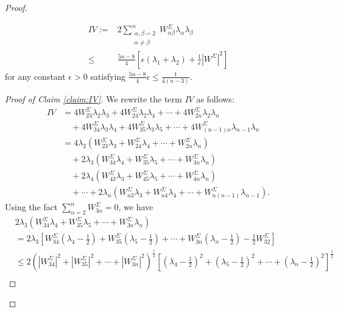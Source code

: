 \documentclass[10pt,a4paper]{amsart}
\begin{document}
\begin{proof}
	\begin{claim}\label{claim:IV}
		\begin{equation*}\label{eq:claim-IV}
		\begin{aligned}
			IV := &2\sum_{\substack{\alpha,\beta=2 \\ \alpha\neq\beta}}^n W^{\Sigma}_{\alpha\beta}\lambda_\alpha\lambda_\beta\\
			 \leq& \frac{5n-8}{4}\left[\epsilon(\lambda_1+\lambda_2) + \frac{1}{\epsilon}|W^{\Sigma}|^2\right]
		\end{aligned}
		\end{equation*}
		for any constant $\epsilon > 0$ satisfying $\frac{5n-8}{4}\epsilon \leq \frac{1}{4(n-3)}$.
	\end{claim}
	
	\begin{proof}[Proof of Claim \ref{claim:IV}]
		We rewrite the term $IV$ as follows:
		\begin{align*}
			IV &= 4W^{\Sigma}_{23}\lambda_{2}\lambda_{3} + 4W^{\Sigma}_{24}\lambda_{2}\lambda_{4} + \cdots + 4W^{\Sigma}_{2n}\lambda_{2}\lambda_{n} \\
			&\quad + 4W^{\Sigma}_{34}\lambda_{3}\lambda_{4} + 4W^{\Sigma}_{35}\lambda_{3}\lambda_{5} + \cdots + 4W^{\Sigma}_{(n-1)n}\lambda_{n-1}\lambda_{n} \\
			&= 4\lambda_{2}(W^{\Sigma}_{23}\lambda_{3} + W^{\Sigma}_{24}\lambda_{4} + \cdots + W^{\Sigma}_{2n}\lambda_{n}) \\
			&\quad + 2\lambda_3(W^{\Sigma}_{34}\lambda_{4} + W^{\Sigma}_{35}\lambda_{5} + \cdots + W^{\Sigma}_{3n}\lambda_{n}) \\
			&\quad + 2\lambda_4(W^{\Sigma}_{43}\lambda_{3} + W^{\Sigma}_{45}\lambda_{5} + \cdots + W^{\Sigma}_{4n}\lambda_{n}) \\
			&\quad + \cdots + 2\lambda_n(W^{\Sigma}_{n3}\lambda_{3} + W^{\Sigma}_{n4}\lambda_{4} + \cdots + W^{\Sigma}_{n(n-1)}\lambda_{n-1}).
		\end{align*}
		Using the fact $\sum_{\alpha=2}^n W^{\Sigma}_{3\alpha} = 0$, we have
		\begin{align*}
			&2\lambda_3(W^{\Sigma}_{34}\lambda_{4} + W^{\Sigma}_{35}\lambda_{5} + \cdots + W^{\Sigma}_{3n}\lambda_{n}) \\
			&= 2\lambda_3\left[W^{\Sigma}_{34}\left(\lambda_{4} - \frac{1}{2}\right) + W^{\Sigma}_{35}\left(\lambda_{5} - \frac{1}{2}\right) + \cdots + W^{\Sigma}_{3n}\left(\lambda_{n} - \frac{1}{2}\right) - \frac{1}{2}W^{\Sigma}_{32}\right] \\
			&\leq 2\left(|W^{\Sigma}_{34}|^2 + |W^{\Sigma}_{35}|^2 + \cdots + |W^{\Sigma}_{3n}|^2\right)^{\frac{1}{2}}\left[\left(\lambda_{4} - \frac{1}{2}\right)^2 + \left(\lambda_{5} - \frac{1}{2}\right)^2 + \cdots + \left(\lambda_{n} - \frac{1}{2}\right)^2\right]^{\frac{1}{2}} \\

\end{align*}
\end{proof}
\end{proof}
\end{document}

